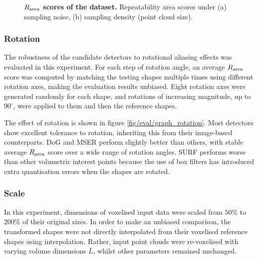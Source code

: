\begin{figure}[ht]
\begin{subfigure}[t]{0.48\linewidth}
		\label{fig/eval/graph_sample}
	\end{subfigure}
	\caption{\textbf{$R_\textrm{area}$ scores of the \meshset dataset.} Repeatability area scores under (a) sampling noise, (b) sampling density (point cloud size).}
	\label{fig/eval/graph_graph0} 
\end{figure}

\subsubsection{Rotation}

The robustness of the candidate detectors to rotational aliasing effects was evaluated in this experiment. For each step of rotation angle, an average $R_\textrm{area}$ score was computed by matching the testing shapes multiple times using different rotation axes, making the evaluation results unbiased. Eight rotation axes were generated randomly for each shape, and rotations of increasing magnitude, up to $90^\circ$, were applied to them and then the reference shapes. 

The effect of rotation is shown in figure \ref{fig/eval/graph_rotation}. Most detectors show excellent tolerance to rotation, inheriting this from their image-based counterparts. 
DoG and MSER perform slightly better than others, with stable average $R_\textrm{area}$ score over a wide range of rotation angles. SURF performs worse than other volumetric interest points because the use of box filters has introduced extra quantisation errors when the shapes are rotated.

\subsubsection{Scale}

In this experiment, dimensions of voxelised input data were scaled from $50\%$ to $200\%$ of their original sizes. In order to make an unbiased comparison, the transformed shapes were not directly interpolated from their voxelised reference shapes using interpolation. Rather, input point clouds were re-voxelised with varying volume dimensions $L$, whilst other parameters remained unchanged. 


